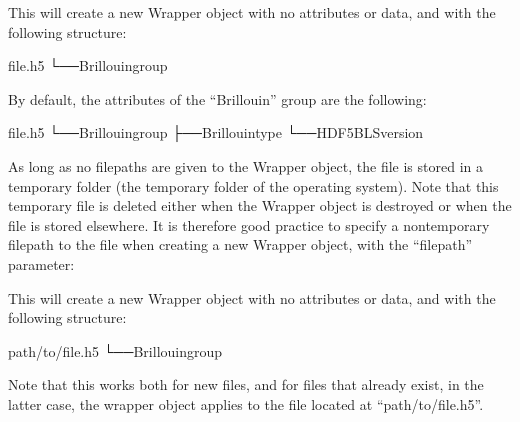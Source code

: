 \documentclass[letterpaper,10pt,english]{sphinxmanual}
\begin{document}
\sphinxAtStartPar
This will create a new Wrapper object with no attributes or data, and with the following structure:

\begin{sphinxVerbatim}[commandchars=\\\{\}]
file.h5
└──Brillouingroup
\end{sphinxVerbatim}

\sphinxAtStartPar
By default, the attributes of the “Brillouin” group are the following:

\begin{sphinxVerbatim}[commandchars=\\\{\}]
file.h5
└──Brillouingroup
├──Brillouin\PYGZus{}type\PYGZhy{}\PYGZgt{}
└──HDF5\PYGZus{}BLS\PYGZus{}version\PYGZhy{}\PYGZgt{}
\end{sphinxVerbatim}

\sphinxAtStartPar
As long as no filepaths are given to the Wrapper object, the file is stored in a temporary folder (the temporary folder of the operating system). Note that this temporary file is deleted either when the Wrapper object is destroyed or when the file is stored elsewhere. It is therefore good practice to specify a non\sphinxhyphen{}temporary filepath to the file when creating a new Wrapper object, with the “filepath” parameter:

\begin{sphinxVerbatim}[commandchars=\\\{\}]
    
\end{sphinxVerbatim}

\sphinxAtStartPar
This will create a new Wrapper object with no attributes or data, and with the following structure:

\begin{sphinxVerbatim}[commandchars=\\\{\}]
path/to/file.h5
└──Brillouingroup
\end{sphinxVerbatim}

\sphinxAtStartPar
Note that this works both for new files, and for files that already exist, in the latter case, the wrapper object applies to the file located at “path/to/file.h5”.
\end{document}
